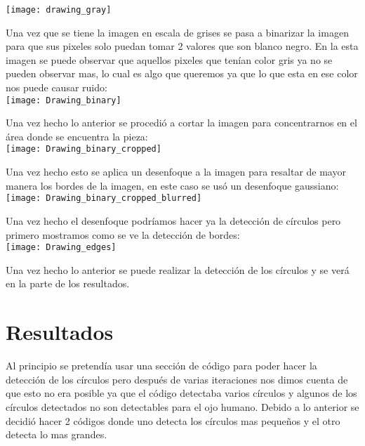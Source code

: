 \documentclass{article}
\begin{document}
	\texttt{[image: drawing\_gray]}
	
	Una vez que se tiene la imagen en escala de grises se pasa a binarizar la imagen para que sus pixeles solo puedan tomar 2 valores que son blanco negro. En la esta imagen se puede observar que aquellos pixeles que tenían color gris ya no se pueden observar mas, lo cual es algo que queremos ya que lo que esta en ese color nos puede causar ruido: \\
	
	\texttt{[image: Drawing\_binary]}
	
	Una vez hecho lo anterior se procedió a cortar la imagen para concentrarnos en el área donde se encuentra la pieza: \\
	
	\texttt{[image: Drawing\_binary\_cropped]}
	
	Una vez hecho esto se aplica un desenfoque a la imagen para resaltar de mayor manera los bordes de la imagen, en este caso se usó un desenfoque gaussiano: \\
	
	\texttt{[image: Drawing\_binary\_cropped\_blurred]}
	
	Una vez hecho el desenfoque podríamos hacer ya la detección de círculos pero primero mostramos como se ve la detección de bordes: \\
	
	\texttt{[image: Drawing\_edges]}
	
	Una vez hecho lo anterior se puede realizar la detección de los círculos y se verá en la parte de los resultados. \\
	
	\section*{Resultados}
	
	Al principio se pretendía usar una sección de código para poder hacer la detección de los círculos pero después de varias iteraciones nos dimos cuenta de que esto no era posible ya que el código detectaba varios círculos y algunos de los círculos detectados no son detectables para el ojo humano. Debido a lo anterior se decidió hacer 2 códigos donde uno detecta los círculos mas pequeños y el otro detecta lo mas grandes. \\
	
\end{document}
